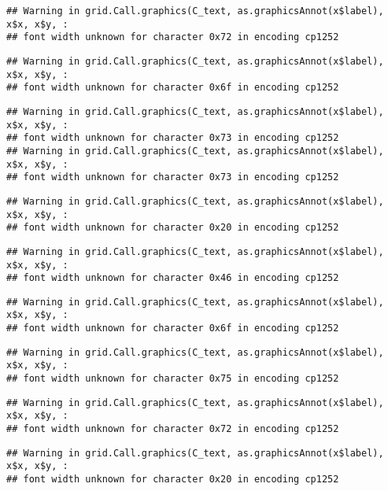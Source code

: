 \documentclass[
]{article}
\begin{document}
\begin{verbatim}
## Warning in grid.Call.graphics(C_text, as.graphicsAnnot(x$label), x$x, x$y, :
## font width unknown for character 0x72 in encoding cp1252
\end{verbatim}

\begin{verbatim}
## Warning in grid.Call.graphics(C_text, as.graphicsAnnot(x$label), x$x, x$y, :
## font width unknown for character 0x6f in encoding cp1252
\end{verbatim}

\begin{verbatim}
## Warning in grid.Call.graphics(C_text, as.graphicsAnnot(x$label), x$x, x$y, :
## font width unknown for character 0x73 in encoding cp1252
## Warning in grid.Call.graphics(C_text, as.graphicsAnnot(x$label), x$x, x$y, :
## font width unknown for character 0x73 in encoding cp1252
\end{verbatim}

\begin{verbatim}
## Warning in grid.Call.graphics(C_text, as.graphicsAnnot(x$label), x$x, x$y, :
## font width unknown for character 0x20 in encoding cp1252
\end{verbatim}

\begin{verbatim}
## Warning in grid.Call.graphics(C_text, as.graphicsAnnot(x$label), x$x, x$y, :
## font width unknown for character 0x46 in encoding cp1252
\end{verbatim}

\begin{verbatim}
## Warning in grid.Call.graphics(C_text, as.graphicsAnnot(x$label), x$x, x$y, :
## font width unknown for character 0x6f in encoding cp1252
\end{verbatim}

\begin{verbatim}
## Warning in grid.Call.graphics(C_text, as.graphicsAnnot(x$label), x$x, x$y, :
## font width unknown for character 0x75 in encoding cp1252
\end{verbatim}

\begin{verbatim}
## Warning in grid.Call.graphics(C_text, as.graphicsAnnot(x$label), x$x, x$y, :
## font width unknown for character 0x72 in encoding cp1252
\end{verbatim}

\begin{verbatim}
## Warning in grid.Call.graphics(C_text, as.graphicsAnnot(x$label), x$x, x$y, :
## font width unknown for character 0x20 in encoding cp1252
\end{verbatim}
\end{document}

